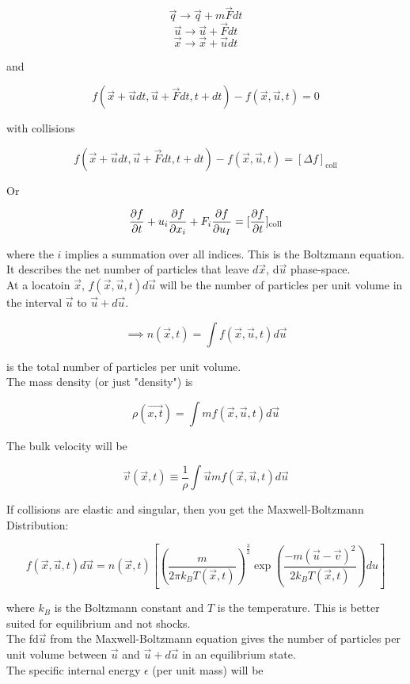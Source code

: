 \documentclass[]{article}
\begin{document}
\[\vec{q} \to \vec{q} + m\vec{F}dt\]
\[\vec{u} \to \vec{u} + \vec{F}dt\]
\[\vec{x} \to \vec{x} + \vec{u}dt\]

and 

\[f(\vec{x} + \vec{u}dt, \vec{u}+\vec{F}dt, t+dt) - f(\vec{x}, \vec{u}, t) = 0\]

with collisions

\[f(\vec{x} + \vec{u}dt, \vec{u}+\vec{F}dt, t+dt) - f(\vec{x}, \vec{u}, t) = [\Delta f]_{\text{coll}}\]

Or 

\[\pdv{f}{t} + u_i\pdv{f}{x_i} + F_i\pdv{f}{u_I} = [\pdv{f}{t}]_{\text{coll}}\]

where the $i$ implies a summation over all indices. This is the Boltzmann equation. It describes the net number of particles that leave $d\vec{x}$, d$\vec{u}$ phase-space.\\

At a locatoin $\vec{x}$, $f(\vec{x}, \vec{u}, t)d\vec{u}$ will be the number of particles per unit volume in the interval $\vec{u}$ to $\vec{u} + d\vec{u}$.

\[\implies n(\vec{x}, t) = \int f(\vec{x}, \vec{u}, t)d\vec{u}\]

is the total number of particles per unit volume.\\

The mass density (or just "density") is 

\[\rho(\vec{x, t}) = \int m f(\vec{x}, \vec{u}, t) d\vec{u}\]

The bulk velocity will be 

\[\vec{v}(\vec{x}, t) \equiv \frac{1}{\rho} \int \vec{u}mf(\vec{x}, \vec{u}, t)d\vec{u}\]

If collisions are elastic and singular, then you get the Maxwell-Boltzmann Distribution:

\[f(\vec{x}, \vec{u}, t)d\vec{u} = n(\vec{x}, t)\left[(\frac{m}{2\pi k_B T(\vec{x}, t)})^\frac{3}{2} \exp(\frac{-m(\vec{u}-\vec{v})^2}{2 k_B T(\vec{x}, t)})du \right]\]

where $k_B$ is the Boltzmann constant and $T$ is the temperature. This is better suited for equilibrium and not shocks.\\

The fd$\vec{u}$ from the Maxwell-Boltzmann equation gives the number of particles per unit volume between $\vec{u}$ and $\vec{u} + d\vec{u}$ in an equilibrium state.\\

The specific internal energy $\epsilon$ (per unit mass) will be 
\end{document}
